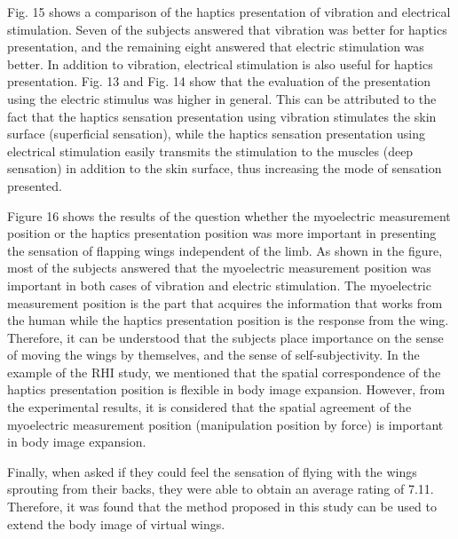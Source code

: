 \documentclass[letterpaper, 10 pt, conference]{ieeeconf}  %
\begin{document}
                Fig. 15 shows a comparison of the haptics presentation of vibration and electrical stimulation. 
                Seven of the subjects answered that vibration was better for haptics presentation, and the remaining eight answered that electric stimulation was better. 
                In addition to vibration, electrical stimulation is also useful for haptics presentation. 
                Fig. 13 and Fig. 14 show that the evaluation of the presentation using the electric stimulus was higher in general. 
                This can be attributed to the fact that the haptics sensation presentation using vibration stimulates the skin surface (superficial sensation), while the haptics sensation presentation using electrical stimulation easily transmits the stimulation to the muscles (deep sensation) in addition to the skin surface, thus increasing the mode of sensation presented.

                Figure 16 shows the results of the question whether the myoelectric measurement position or the haptics presentation position was more important in presenting the sensation of flapping wings independent of the limb. 
                As shown in the figure, most of the subjects answered that the myoelectric measurement position was important in both cases of vibration and electric stimulation.
                The myoelectric measurement position is the part that acquires the information that works from the human while the haptics presentation position is the response from the wing.
                Therefore, it can be understood that the subjects place importance on the sense of moving the wings by themselves, and the sense of self-subjectivity.
                In the example of the RHI study, we mentioned that the spatial correspondence of the haptics presentation position is flexible in body image expansion. However, from the experimental results, it is considered that the spatial agreement of the myoelectric measurement position (manipulation position by force) is important in body image expansion.

                Finally, when asked if they could feel the sensation of flying with the wings sprouting from their backs, they were able to obtain an average rating of 7.11. 
                Therefore, it was found that the method proposed in this study can be used to extend the body image of virtual wings.
\end{document}
